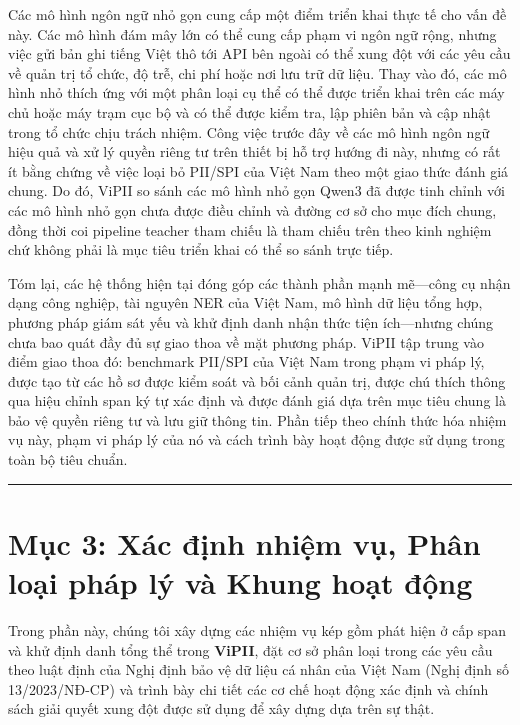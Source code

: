 \documentclass[
  11pt,
  a4paper,
]{article}
\begin{document}
Các mô hình ngôn ngữ nhỏ gọn cung cấp một điểm triển khai thực tế cho
vấn đề này. Các mô hình đám mây lớn có thể cung cấp phạm vi ngôn ngữ
rộng, nhưng việc gửi bản ghi tiếng Việt thô tới API bên ngoài có thể
xung đột với các yêu cầu về quản trị tổ chức, độ trễ, chi phí hoặc nơi
lưu trữ dữ liệu. Thay vào đó, các mô hình nhỏ thích ứng với một phân
loại cụ thể có thể được triển khai trên các máy chủ hoặc máy trạm cục bộ
và có thể được kiểm tra, lập phiên bản và cập nhật trong tổ chức chịu
trách nhiệm. Công việc trước đây về các mô hình ngôn ngữ hiệu quả và xử
lý quyền riêng tư trên thiết bị hỗ trợ hướng đi này, nhưng có rất ít
bằng chứng về việc loại bỏ PII/SPI của Việt Nam theo một giao thức đánh
giá chung. Do đó, ViPII so sánh các mô hình nhỏ gọn Qwen3 đã được tinh
chỉnh với các mô hình nhỏ gọn chưa được điều chỉnh và đường cơ sở cho
mục đích chung, đồng thời coi pipeline teacher tham chiếu là tham chiếu
trên theo kinh nghiệm chứ không phải là mục tiêu triển khai có thể so
sánh trực tiếp.

Tóm lại, các hệ thống hiện tại đóng góp các thành phần mạnh mẽ---công cụ
nhận dạng công nghiệp, tài nguyên NER của Việt Nam, mô hình dữ liệu tổng
hợp, phương pháp giám sát yếu và khử định danh nhận thức tiện
ích---nhưng chúng chưa bao quát đầy đủ sự giao thoa về mặt phương pháp.
ViPII tập trung vào điểm giao thoa đó: benchmark PII/SPI của Việt Nam
trong phạm vi pháp lý, được tạo từ các hồ sơ được kiểm soát và bối cảnh
quản trị, được chú thích thông qua hiệu chỉnh span ký tự xác định và
được đánh giá dựa trên mục tiêu chung là bảo vệ quyền riêng tư và lưu
giữ thông tin. Phần tiếp theo chính thức hóa nhiệm vụ này, phạm vi pháp
lý của nó và cách trình bày hoạt động được sử dụng trong toàn bộ tiêu
chuẩn.

\begin{center}\rule{0.5\linewidth}{0.5pt}\end{center}

\section{Mục 3: Xác định nhiệm vụ, Phân loại pháp lý và Khung hoạt
động}\label{mux1ee5c-3-xuxe1c-ux111ux1ecbnh-nhiux1ec7m-vux1ee5-phuxe2n-loux1ea1i-phuxe1p-luxfd-vuxe0-khung-houx1ea1t-ux111ux1ed9ng}

Trong phần này, chúng tôi xây dựng các nhiệm vụ kép gồm phát hiện ở cấp
span và khử định danh tổng thể trong \textbf{ViPII}, đặt cơ sở phân loại
trong các yêu cầu theo luật định của Nghị định bảo vệ dữ liệu cá nhân
của Việt Nam (Nghị định số 13/2023/NĐ-CP) và trình bày chi tiết các cơ
chế hoạt động xác định và chính sách giải quyết xung đột được sử dụng để
xây dựng dựa trên sự thật.
\end{document}
